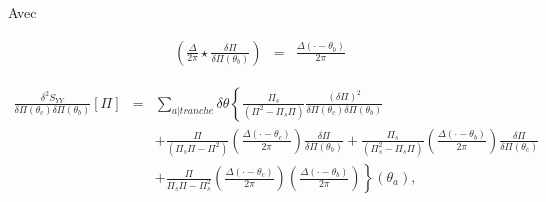 	Avec 
	
	\begin{eqnarray}
			\left  ( \frac{\Delta}{2\pi} \star \frac{\delta \Pi}{\delta \Pi(\theta_b) }  \right ) & = & 	\frac{\Delta ( \cdot - \theta_b )}{2\pi}
		\end{eqnarray}
	
	\begin{eqnarray}
		\frac{ \delta^2 S_{YY} }{ \delta \Pi(\theta_c) \delta \Pi(\theta_b)  } [\Pi ]  & = & \sum_{a \vert tranche}   \delta \theta \left \{  \frac{\Pi_s}{(\Pi^2  - \Pi_s\Pi)} \frac{(\delta \Pi)^2}{ \delta \Pi(\theta_c) \delta \Pi(\theta_b)  } \right . \\
		&  &  +  \left . \frac{\Pi }{(\Pi_s\Pi -\Pi^2) } \left ( \frac{\Delta ( \cdot - \theta_c )}{2\pi}   \right ) \frac{\delta \Pi}{\delta \Pi(\theta_b)}+ \frac{\Pi_s }{( \Pi_s^2 - \Pi_s \Pi) } \left (  \frac{\Delta ( \cdot - \theta_b )}{2\pi} \right ) \frac{\delta \Pi}{\delta \Pi(\theta_c)} \right . \\
		& & + \left .  \frac{\Pi }{\Pi_s\Pi - \Pi_s^2 }\left (  \frac{\Delta ( \cdot - \theta_c )}{2\pi} \right )\left (  \frac{\Delta ( \cdot - \theta_b )}{2\pi} \right )  \right \}(\theta_a),	
	\end{eqnarray}
	
	
		


		
%	
	
	
